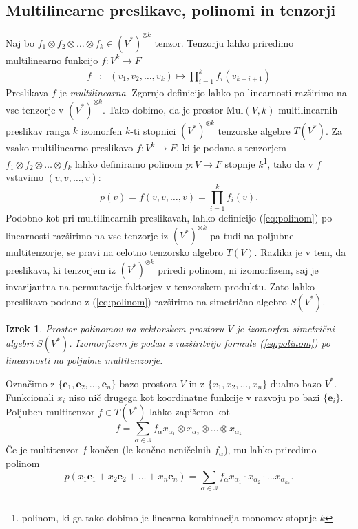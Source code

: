 \documentclass{article}
\newcommand{\JJ}{\mathbb{J}}
\newcommand{\e}{\mathbf{e}}
\newtheorem{izrek}{Izrek}[section]
\begin{document}
\subsection{Multilinearne preslikave, polinomi in tenzorji}
Naj bo $f_1\otimes f_2\otimes \ldots \otimes f_k\in (V^*)^{\otimes k}$
tenzor. Tenzorju lahko priredimo multilinearno funkcijo $f:V^k\to F$ 
\begin{eqnarray}
  \label{eq:multilinear}
f&:&(v_1,v_2,\ldots,v_k) \mapsto \prod_{i=1}^k f_i(v_{k-i+1}) 
\end{eqnarray}
Preslikava $f$ je \emph{multilinearna}. Zgornjo definicijo lahko po linearnosti
razširimo na vse tenzorje v $(V^*)^{\otimes k}$. Tako dobimo, da je prostor
$\mathrm{Mul}(V,k)$ multilinearnih preslikav ranga $k$ izomorfen $k$-ti stopnici
$(V^*)^{\otimes k}$ tenzorske algebre $T(V^*)$. 
Za vsako multilinearno preslikavo $f:V^k\to F$, ki je podana s tenzorjem
$f_1\otimes f_2\otimes\ldots \otimes f_k$ lahko definiramo polinom $p:V\to
F$ stopnje $k$\footnote{polinom, ki ga tako dobimo je linearna kombinacija monomov stopnje $k$}, tako da v $f$ vstavimo $(v,v,\ldots, v)$:
\begin{equation}
  \label{eq:polinom}
  p(v) = f(v,v,\ldots, v) = \prod_{i=1}^kf_i(v).
\end{equation}
Podobno kot pri multilinearnih preslikavah, lahko definicijo (\ref{eq:polinom})
po linearnosti razširimo na vse tenzorje iz $(V^*)^{\otimes k}$ pa tudi na
poljubne multitenzorje, se pravi na celotno tenzorsko algebro $T(V)$. Razlika je v
tem, da preslikava, ki tenzorjem iz $(V^*)^{\otimes k}$ priredi polinom, ni
izomorfizem, saj je invarijantna na permutacije faktorjev v tenzorskem
produktu. Zato lahko preslikavo podano z (\ref{eq:polinom}) razširimo na 
simetrično algebro $S(V^*)$.
\begin{izrek}
  Prostor polinomov na vektorskem prostoru $V$ je izomorfen simetrični algebri
  $S(V^*)$. Izomorfizem je podan z razširitvijo formule (\ref{eq:polinom}) po
  linearnosti na poljubne multitenzorje.
\end{izrek}
Označimo z $\{\e_1,\e_2,\ldots,\e_n\}$ bazo prostora $V$ in z $\{x_1,x_2,\ldots,
x_n\}$ dualno bazo $V^*$. Funkcionali $x_i$ niso nič drugega kot koordinatne
funkcije v razvoju po bazi $\{\e_i\}$. Poljuben multitenzor $f\in T(V^*)$ lahko
zapišemo kot 
$$f = \sum_{\alpha \in \JJ}f_\alpha x_{\alpha_1}\otimes
x_{\alpha_2}\otimes\ldots \otimes x_{\alpha_k}$$
Če je multitenzor $f$ končen (le končno neničelnih $f_\alpha$),  mu lahko
priredimo polinom 
$$p(x_1\e_1+x_2\e_2+\ldots +x_n\e_n)=\sum_{\alpha \in \JJ}f_\alpha x_{\alpha_1}\cdot
x_{\alpha_2}\cdot\ldots  x_{\alpha_{k_\alpha}}.$$
 
\end{document}
